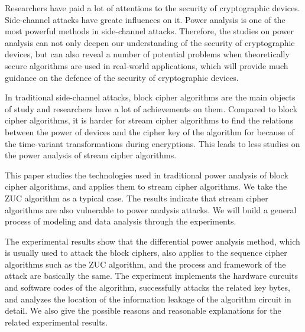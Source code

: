 \begin{englishabstract}
Researchers have paid a lot of attentions to the security of cryptographic devices. Side-channel attacks have greate influences on it. Power analysis is one of the most powerful methods in side-channel attacks. Therefore, the studies on power analysis can not only deepen our understanding of the security of cryptographic devices, but can also reveal a number of potential problems when theoretically secure algorithms are used in real-world applications, which will provide much guidance on the defence of the security of cryptographic devices.

In traditional side-channel attacks, block cipher algorithms are the main objects of study and researchers have a lot of achievements on them. Compared to block cipher algorithms, it is harder for stream cipher algorithms to find the relations between the power of devices and the cipher key of the algorithm for because of the time-variant transformations during encryptions. This leads to less studies on the power analysis of stream cipher algorithms.

This paper studies the technologies used in traditional power analysis of block cipher algorithms, and applies them to stream cipher algorithms. We take the ZUC algorithm as a typical case. The results indicate that stream cipher algorithms are also vulnerable to power analysis attacks. We will build a general process of modeling and data analysis through the experiments.

The experimental results show that the differential power analysis method, which is usually used to attack the block ciphers, also applies to the sequence cipher algorithms such as the ZUC algorithm, and the process and framework of the attack are basically the same. The experiment implements the hardware curcuits and software codes of the algorithm, successfully attacks the related key bytes, and analyzes the location of the information leakage of the algorithm circuit in detail. We also give the possible reasons and reasonable explanations for the related experimental results.

\end{englishabstract}

